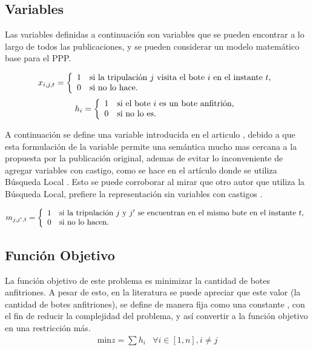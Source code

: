 \documentclass[letter, 10pt]{article}
\begin{document}
\subsection{Variables}
Las variables definidas a continuación son variables que se pueden encontrar a lo largo de todos las publicaciones, y se pueden considerar un modelo matemático base para el PPP.

\begin{equation}
x_{i,j,t} = \left\{
\begin{array}{c l}      
	1 & \text{si la tripulación $j$ visita el bote $i$ en el instante $t$,} \\
	0 & \text{si no lo hace.}
\end{array}\right.
\end{equation}
\begin{equation}
h_i = \left\{
\begin{array}{c l}      
	1 & \text{si el bote $i$ es un bote anfitrión,} \\
	0 & \text{si no lo es.}
\end{array}\right.
\end{equation}

A continuación se define una variable introducida en el articulo \cite{PPPAsMIP}, debido a que esta formulación de la variable permite una semántica mucho mas cercana a la propuesta por la publicación original, ademas de evitar lo inconveniente de agregar variables con castigo, como se hace en el artículo donde se utiliza Búsqueda Local \cite{LocalSearch}. Esto se puede corroborar al mirar que otro autor que utiliza la Búsqueda Local, prefiere la representación sin variables con castigos \cite{PseudoLocal}.

\begin{equation}
m_{j,j',t} = \left\{
\begin{array}{c l}      
	1 & \text{si la tripulación $j$ y $j'$ se encuentran en el mismo bote en el instante $t$,} \\
	0 & \text{si no lo hacen.}
\end{array}\right.
\end{equation}

\subsection{Función Objetivo}
La función objetivo de este problema es minimizar la cantidad de botes anfitriones. A pesar de esto, en la literatura se puede apreciar que este valor (la cantidad de botes anfitriones), se define de manera fija como una constante \cite{PPPAsMIP,FirstPublication,PseudoLocal,LocalSearch}, con el fin de reducir la complejidad del problema, y así convertir a la función objetivo en una restricción más.
\begin{eqnarray}
\text{min} z = \sum h_i & \forall i \in [1,n] , i \neq j
\end{eqnarray}
\end{document}
